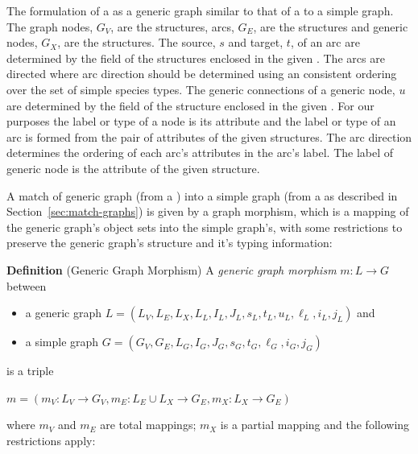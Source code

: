 \documentclass{cekarticle}
\begin{document}
The formulation of a  as a generic graph similar to that
of a  to a simple graph.
The graph nodes, $G_{V}$, are the  structures,
arcs, $G_{E}$, are the  structures and generic nodes, $G_{X}$, are the
 structures.  The source, $s$ and target, $t$, of an arc are determined by the
 field of the  structures enclosed in the given
.  The arcs are directed
where arc direction should be determined using an consistent ordering over the set of simple species
types.
The generic connections of a generic node, $u$ are determined by the  field
of the  structure enclosed in the given .
For our purposes the label or type of a node is its
 attribute and the label or type of an arc is formed from the pair of
 attributes of the given  structures.
The arc direction determines the ordering of each arc's 
attributes in the arc's label.
The label of generic node is the  attribute of the given
 structure.

A match of generic graph (from a )
into a simple graph (from a  as described in
Section~\ref{sec:match-graphs}) is given by a graph morphism,
which is a mapping of the generic graph's object sets into the
simple graph's, with some restrictions to preserve the generic
graph's structure and it's typing information:

\textbf{Definition} (Generic Graph Morphism) A \emph{generic graph morphism}
$m : L \rightarrow G$ between
\begin{itemize}
\item a generic graph
$L = (L_{V}, L_{E}, L_{X}, L_{L}, I_{L}, J_{L}, s_{L}, t_{L}, u_{L}, \ell_{L}, i_{L}, j_{L})$ and
\item a simple graph $G = (G_{V}, G_{E}, L_{G}, I_{G}, J_{G}, s_{G}, t_{G}, \ell_{G}, i_{G}, j_{G})$
\end{itemize}
is a triple

$m = (m_{V} : L_{V} \rightarrow G_{V}, m_{E} : L_{E} \cup L_{X}
\rightarrow G_{E}, m_{X} : L_{X} \rightarrow G_{E})$

where $m_{V}$ and $m_{E}$ are total mappings; $m_{X}$ is a partial
mapping and the following restrictions apply:
\end{document}
